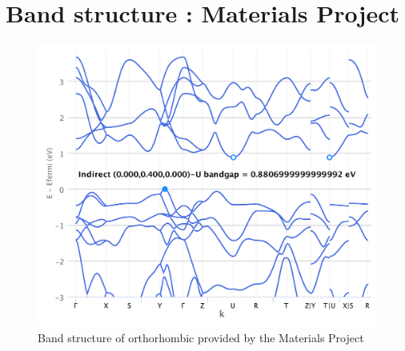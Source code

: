 \documentclass[11pt,a4paper]{article}
\begin{document}
\section{Band structure : Materials Project}
\label{Abi7}
\begin{figure}[h]
\centering
\includegraphics[width=\textwidth]{images/chart.pdf}
\caption{Band structure of orthorhombic  provided by the Materials Project}
\end{figure}
\newpage
\end{document}
